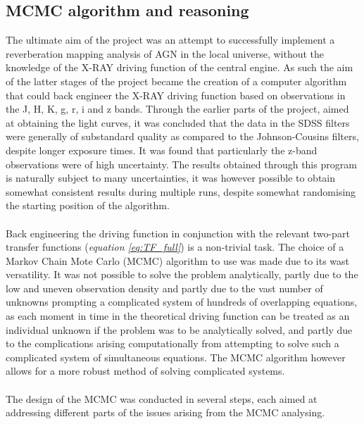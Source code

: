 \documentclass[a4paper, 12pt, twoside]{article}
\begin{document}
\subsection{MCMC algorithm and reasoning}
The ultimate aim of the project was an attempt to successfully implement a reverberation mapping analysis of AGN in the local universe, without the knowledge of the X-RAY driving function of the central engine. As such the aim of the latter stages of the project became the creation of a computer algorithm that could back engineer the X-RAY driving function based on observations in the J, H, K, g, r, i and z bands. Through the earlier parts of the project, aimed at obtaining the light curves, it was concluded that the data in the SDSS filters were generally of substandard quality as compared to the Johnson-Cousins filters, despite longer exposure times. It was found that particularly the z-band observations were of high uncertainty. The results obtained through this program is naturally subject to many uncertainties, it was however possible to obtain somewhat consistent results during multiple runs, despite somewhat randomising the starting position of the algorithm. \\
\\
Back engineering the driving function in conjunction with the relevant two-part transfer functions (\emph{equation \ref{eq:TF_full}}) is a non-trivial task. The choice of a Markov Chain Mote Carlo (MCMC) algorithm to use was made due to its wast versatility. It was not possible to solve the problem analytically, partly due to the low and uneven observation density and partly due to the vast number of unknowns prompting a complicated system of hundreds of overlapping equations, as each moment in time in the theoretical driving function can be treated as an individual unknown if the problem was to be analytically solved, and partly due to the complications arising computationally from attempting to solve such a complicated system of simultaneous equations. The MCMC algorithm however allows for a more robust method of solving complicated systems. \\
\\
The design of the MCMC was conducted in several steps, each aimed at addressing different parts of the issues arising from the MCMC analysing.
\end{document}
